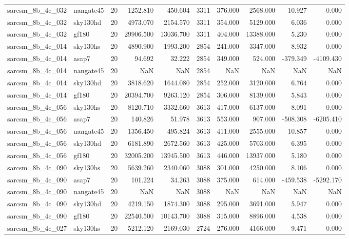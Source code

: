\documentclass{article}
\begin{document}
\begin{longtable}{llrrrrrrrr}
sarcsm\_8b\_4c\_032 & nangate45 & 20 & 1252.810 & 450.604 & 3311 & 376.000 & 2568.000 & 10.927 & 0.000 \\
sarcsm\_8b\_4c\_032 & sky130hd & 20 & 4973.070 & 2154.570 & 3311 & 354.000 & 5129.000 & 6.036 & 0.000 \\
sarcsm\_8b\_4c\_032 & gf180 & 20 & 29906.500 & 13036.700 & 3311 & 404.000 & 13388.000 & 5.230 & 0.000 \\
sarcsm\_8b\_4c\_014 & sky130hs & 20 & 4890.900 & 1993.200 & 2854 & 241.000 & 3347.000 & 8.932 & 0.000 \\
sarcsm\_8b\_4c\_014 & asap7 & 20 & 94.692 & 32.222 & 2854 & 349.000 & 524.000 & -379.349 & -4109.430 \\
sarcsm\_8b\_4c\_014 & nangate45 & 20 & NaN & NaN & 2854 & NaN & NaN & NaN & NaN \\
sarcsm\_8b\_4c\_014 & sky130hd & 20 & 3818.620 & 1644.080 & 2854 & 252.000 & 3120.000 & 6.764 & 0.000 \\
sarcsm\_8b\_4c\_014 & gf180 & 20 & 20394.700 & 9263.120 & 2854 & 306.000 & 8139.000 & 5.843 & 0.000 \\
sarcsm\_8b\_4c\_056 & sky130hs & 20 & 8120.710 & 3332.660 & 3613 & 417.000 & 6137.000 & 8.091 & 0.000 \\
sarcsm\_8b\_4c\_056 & asap7 & 20 & 140.826 & 51.978 & 3613 & 553.000 & 907.000 & -508.308 & -6205.410 \\
sarcsm\_8b\_4c\_056 & nangate45 & 20 & 1356.450 & 495.824 & 3613 & 411.000 & 2555.000 & 10.857 & 0.000 \\
sarcsm\_8b\_4c\_056 & sky130hd & 20 & 6181.890 & 2672.560 & 3613 & 425.000 & 5703.000 & 6.395 & 0.000 \\
sarcsm\_8b\_4c\_056 & gf180 & 20 & 32005.200 & 13945.500 & 3613 & 446.000 & 13937.000 & 5.180 & 0.000 \\
sarcsm\_8b\_4c\_090 & sky130hs & 20 & 5639.260 & 2340.060 & 3088 & 301.000 & 4250.000 & 8.106 & 0.000 \\
sarcsm\_8b\_4c\_090 & asap7 & 20 & 101.224 & 34.263 & 3088 & 375.000 & 614.000 & -459.538 & -5292.170 \\
sarcsm\_8b\_4c\_090 & nangate45 & 20 & NaN & NaN & 3088 & NaN & NaN & NaN & NaN \\
sarcsm\_8b\_4c\_090 & sky130hd & 20 & 4219.150 & 1874.300 & 3088 & 295.000 & 3691.000 & 5.947 & 0.000 \\
sarcsm\_8b\_4c\_090 & gf180 & 20 & 22540.500 & 10143.700 & 3088 & 315.000 & 8896.000 & 4.538 & 0.000 \\
sarcsm\_8b\_4c\_027 & sky130hs & 20 & 5212.120 & 2169.030 & 2724 & 276.000 & 4166.000 & 9.471 & 0.000 \\

\end{longtable}
\end{document}

